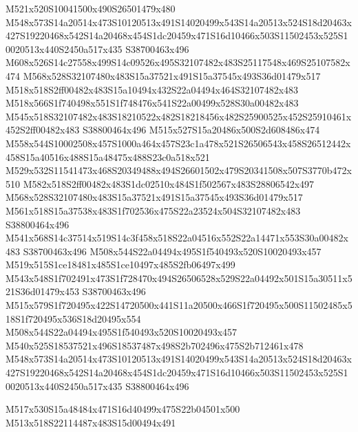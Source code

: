 \documentclass{article}
\begin{document}
\begin{multicols}{2}
M521x520S10041500x490S26501479x480 M548x573S14a20514x473S10120513x491S14020499x543S14a20513x524S18d20463x427S19220468x542S14a20468x454S1dc20459x471S16d10466x503S11502453x525S10020513x440S2450a517x435 S38700463x496 M608x526S14c27558x499S14c09526x495S32107482x483S25117548x469S25107582x474 M568x528S32107480x483S15a37521x491S15a37545x493S36d01479x517 M518x518S2ff00482x483S15a10494x432S22a04494x464S32107482x483 M518x566S1f740498x551S1f748476x541S22a00499x528S30a00482x483 M545x518S32107482x483S18210522x482S18218456x482S25900525x452S25910461x452S2ff00482x483 S38800464x496 M515x527S15a20486x500S2d608486x474 M558x544S10002508x457S1000a464x457S23c1a478x521S26506543x458S26512442x458S15a40516x488S15a48475x488S23c0a518x521 M529x532S11541473x468S20349488x494S26601502x479S20341508x507S3770b472x510 M582x518S2ff00482x483S1dc02510x484S1f502567x483S28806542x497 M568x528S32107480x483S15a37521x491S15a37545x493S36d01479x517 M561x518S15a37538x483S1f702536x475S22a23524x504S32107482x483 S38800464x496 M541x568S14c37514x519S14c3f458x518S22a04516x552S22a14471x553S30a00482x483 S38700463x496 M508x544S22a04494x495S1f540493x520S10020493x457 M519x515S1ce18481x485S1ce10497x485S2fb06497x499 M543x548S1f702491x473S1f728470x494S26506528x529S22a04492x501S15a30511x521S36d01479x453 S38700463x496 M515x579S1f720495x422S14720500x441S11a20500x466S1f720495x500S11502485x518S1f720495x536S18d20495x554 M508x544S22a04494x495S1f540493x520S10020493x457 M540x525S18537521x496S18537487x498S2b702496x475S2b712461x478 M548x573S14a20514x473S10120513x491S14020499x543S14a20513x524S18d20463x427S19220468x542S14a20468x454S1dc20459x471S16d10466x503S11502453x525S10020513x440S2450a517x435 S38800464x496





\begin{center}
M517x530S15a48484x471S16d40499x475S22b04501x500 M513x518S22114487x483S15d00494x491 
\end{center}



\end{multicols}
\end{document}
